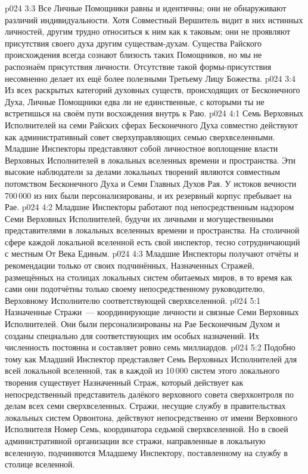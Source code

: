 \vs p024 3:3 Все Личные Помощники равны и идентичны; они не обнаруживают различий индивидуальности. Хотя Совместный Вершитель видит в них истинных личностей, другим трудно относиться к ним как к таковым; они не проявляют присутствия своего духа другим существам\hyp{}духам. Существа Райского происхождения всегда сознают близость таких Помощников, но мы не распознаём присутствия личности. Отсутствие такой формы\hyp{}присутствия несомненно делает их ещё более полезными Третьему Лицу Божества.
\vs p024 3:4 Из всех раскрытых категорий духовных существ, происходящих от Бесконечного Духа, Личные Помощники едва ли не единственные, с которыми ты не встретишься на своём пути восхождения внутрь к Раю.
\vs p024 4:1 Семь Верховных Исполнителей на семи Райских сферах Бесконечного Духа совместно действуют как административный совет сверхуправляющих семью сверхвселенными. Младшие Инспекторы представляют собой личностное воплощение власти Верховных Исполнителей в локальных вселенных времени и пространства. Эти высокие наблюдатели за делами локальных творений являются совместным потомством Бесконечного Духа и Семи Главных Духов Рая. У истоков вечности 700\,000 из них были персонализированы, и их резервный корпус пребывает на Рае.
\vs p024 4:2 Младшие Инспекторы работают под непосредственным надзором Семи Верховных Исполнителей, будучи их личными и могущественными представителями в локальных вселенных времени и пространства. На столичной сфере каждой локальной вселенной есть свой инспектор, тесно сотрудничающий с местным От Века Единым.
\vs p024 4:3 Младшие Инспекторы получают отчёты и рекомендации только от своих подчинённых, Назначенных Стражей, размещённых на столицах локальных систем обитаемых миров, в то время как сами они подотчётны только своему непосредственному руководителю, Верховному Исполнителю соответствующей сверхвселенной.
\vs p024 5:1 Назначенные Стражи~--- координирующие личности и связные Семи Верховных Исполнителей. Они были персонализированы на Рае Бесконечным Духом и созданы специально для соответствующих им особых назначений. Их численность постоянна и составляет ровно семь миллиардов.
\vs p024 5:2 Подобно тому как Младший Инспектор представляет Семь Верховных Исполнителей для всей локальной вселенной, так в каждой из 10\,000 систем этого локального творения существует Назначенный Страж, который действует как непосредственный представитель далёкого верховного совета сверхконтроля по делам всех семи сверхвселенных. Стражи, несущие службу в правительствах локальных систем Орвонтона, действуют непосредственно от имени Верховного Исполнителя Номер Семь, координатора седьмой сверхвселенной. Но в своей административной организации все стражи, направленные в локальную вселенную, подчиняются Младшему Инспектору, поставленному на службу в столице вселенной.
